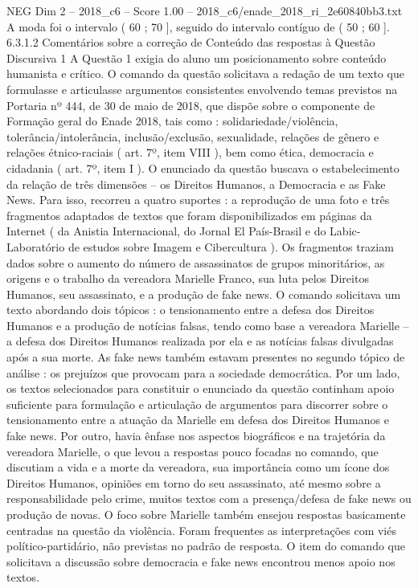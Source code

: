 \begin{textsample}{NEG Dim 2 – 2018\_c6 – Score 1.00 – 2018\_c6/enade\_2018\_ri\_2e60840bb3.txt}
A moda foi o intervalo ( 60 ; 70 ], seguido do intervalo contíguo de ( 50 ; 60 ]. 6.3.1.2 Comentários sobre a correção de Conteúdo das respostas à Questão Discursiva 1 A Questão 1 exigia do aluno um posicionamento sobre conteúdo humanista e crítico.
O comando da questão solicitava a redação de um texto que formulasse e articulasse argumentos consistentes envolvendo temas previstos na Portaria nº 444, de 30 de maio de 2018, que dispõe sobre o componente de Formação geral do Enade 2018, tais como : solidariedade/violência, tolerância/intolerância, inclusão/exclusão, sexualidade, relações de gênero e relações étnico-raciais ( art. 7º, item VIII ), bem como ética, democracia e cidadania ( art. 7º, item I ).
O enunciado da questão buscava o estabelecimento da relação de três dimensões – os Direitos Humanos, a Democracia e as Fake News.
Para isso, recorreu a quatro suportes : a reprodução de uma foto e três fragmentos adaptados de textos que foram disponibilizados em páginas da Internet ( da Anistia Internacional, do Jornal El País-Brasil e do Labic-Laboratório de estudos sobre Imagem e Cibercultura ).
Os fragmentos traziam dados sobre o aumento do número de assassinatos de grupos minoritários, as origens e o trabalho da vereadora Marielle Franco, sua luta pelos Direitos Humanos, seu assassinato, e a produção de fake news.
O comando solicitava um texto abordando dois tópicos : o tensionamento entre a defesa dos Direitos Humanos e a produção de notícias falsas, tendo como base a vereadora Marielle – a defesa dos Direitos Humanos realizada por ela e as notícias falsas divulgadas após a sua morte.
As fake news também estavam presentes no segundo tópico de análise : os prejuízos que provocam para a sociedade democrática.
Por um lado, os textos selecionados para constituir o enunciado da questão continham apoio suficiente para formulação e articulação de argumentos para discorrer sobre o tensionamento entre a atuação da Marielle em defesa dos Direitos Humanos e fake news.
Por outro, havia ênfase nos aspectos biográficos e na trajetória da vereadora Marielle, o que levou a respostas pouco focadas no comando, que discutiam a vida e a morte da vereadora, sua importância como um ícone dos Direitos Humanos, opiniões em torno do seu assassinato, até mesmo sobre a responsabilidade pelo crime, muitos textos com a presença/defesa de fake news ou produção de novas.
O foco sobre Marielle também ensejou respostas basicamente centradas na questão da violência.
Foram frequentes as interpretações com viés político-partidário, não previstas no padrão de resposta.
O item do comando que solicitava a discussão sobre democracia e fake news encontrou menos apoio nos textos.

\end{textsample}
